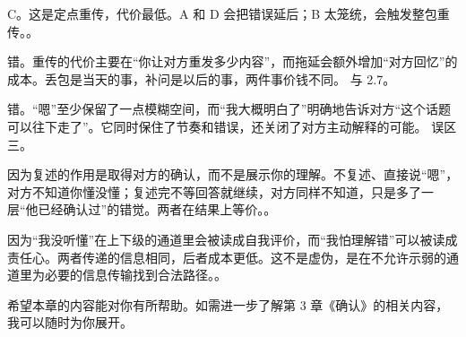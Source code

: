 \begin{answerssec}
\item C。这是定点重传，代价最低。A 和 D 会把错误延后；B 太笼统，会触发整包重传。。

\item 错。重传的代价主要在“你让对方重发多少内容”，而拖延会额外增加“对方回忆”的成本。丢包是当天的事，补问是以后的事，两件事价钱不同。 与 2.7。

\item 错。“嗯”至少保留了一点模糊空间，而“我大概明白了”明确地告诉对方“这个话题可以往下走了”。它同时保住了节奏和错误，还关闭了对方主动解释的可能。 误区三。

\item 因为复述的作用是取得对方的确认，而不是展示你的理解。不复述、直接说“嗯”，对方不知道你懂没懂；复述完不等回答就继续，对方同样不知道，只是多了一层“他已经确认过”的错觉。两者在结果上等价。。

\item 因为“我没听懂”在上下级的通道里会被读成自我评价，而“我怕理解错”可以被读成责任心。两者传递的信息相同，后者成本更低。这不是虚伪，是在不允许示弱的通道里为必要的信息传输找到合法路径。。
\end{answerssec}

\hcirule

\begin{qabox}
\end{qabox}

\hcirule

希望本章的内容能对你有所帮助。如需进一步了解第 3 章《确认》的相关内容，我可以随时为你展开。

